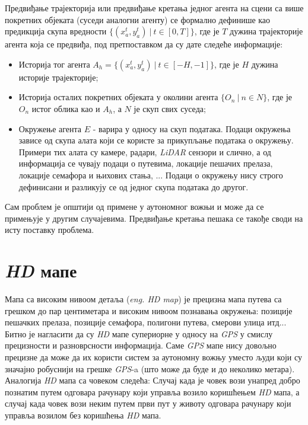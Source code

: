 \documentclass[11pt,oneside]{memoir}
\begin{document}
Предвиђање трајекторија или предвиђање кретања једног агента на сцени са више покретних објеката (суседи аналогни агенту) се формално
дефинише као предикција скупа вредности $\{(x^{t}_a, y^{t}_a)\ |\ t \in [0, T]\}$, где је $T$ дужина трајекторије агента која се предвиђа, 
под претпоставком да су дате следеће информације:
\begin{itemize}
  \item Историја тог агента $A_{h} = \{(x^{t}_a, y^{t}_a)\ |\ t \in [-H, -1]\}$, где је $H$ дужина историје трајекторије;
  \item Историја осталих покретних објеката у околини агента $\{O_{n}\ |\ n \in N\}$, 
        где је $O_{n}$ истог облика као и $A_{h}$, а $N$ је скуп свих суседа;
  \item Окружење агента $E$ - варира у односу на скуп података. Подаци окружења зависе од скупа алата који се користе
        за прикупљање података о окружењу. Примери тих алата су камере, радари, \textit{LiDAR} сензори и слично, а 
        од информација се чувају подаци о путевима,
        локације пешачих прелаза, локације семафора и њихових стања, ... Подаци о окружењу нису строго дефинисани и 
        разликују се од једног скупа података до другог.
\end{itemize}

Сам проблем је општији од примене у аутономног вожњи и може да се примењује у другим случајевима. Предвиђање кретања пешака се
такође своди на исту поставку проблема.

\section{\textit{HD} мапе}

Мапа са високим нивоом детаља (\textit{eng. HD map}) је прецизна
мапа путева са грешком до пар центиметара и високим нивоом
познавања окружења: позиције пешачких прелаза, позиције семафора, полигони путева, смерови улица итд... Битно је нагласити
да су \textit{HD} мапе супериорне у односу на \textit{GPS} у смислу прецизности и разноврсности информација. Саме \textit{GPS}
мапе нису довољно прецизне да може да их користи систем за аутономну вожњу уместо људи који су значајно робуснији на грешке
\textit{GPS}-a (што може да буде и до неколико метара). Аналогија 
\textit{HD} мапа са човеком следећа: Случај када је човек вози унапред добро познатим путем одговара рачунару који управља
возило коришћењем \textit{HD} мапа, а случај када човек вози неким путем први пут у животу одговара рачунару који управља возилом
без коришћења \textit{HD} мапа.
\end{document}
